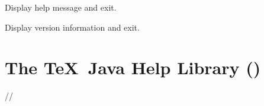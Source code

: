 \documentclass[toc=listof]{scrreport}
\begin{document}
Display help message and exit.

Display version information and exit.

\chapter{The \TeX\ Java Help Library ()}
\label{sec:texjavahelplib}

//


\printmain

\printindex
\end{document}
